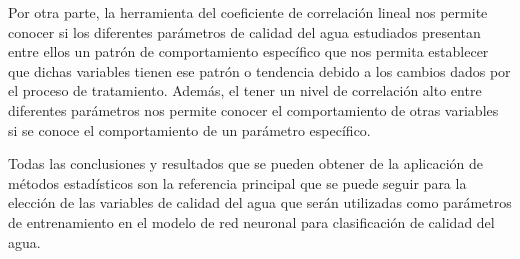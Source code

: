 Por otra parte, la herramienta del coeficiente de correlación lineal nos permite conocer si los diferentes parámetros de calidad del agua estudiados presentan entre ellos un patrón de comportamiento específico que nos permita 
establecer que dichas variables tienen ese patrón o tendencia debido a los cambios dados por el proceso de tratamiento. Además, el tener un nivel de correlación alto entre diferentes parámetros nos permite conocer el comportamiento 
de otras variables si se conoce el comportamiento de un parámetro específico. 

Todas las conclusiones y resultados que se pueden obtener de la aplicación de métodos estadísticos son la referencia principal que se puede seguir para la elección de las variables de calidad del agua que serán utilizadas 
como parámetros de entrenamiento en el modelo de red neuronal para clasificación de calidad del agua.
